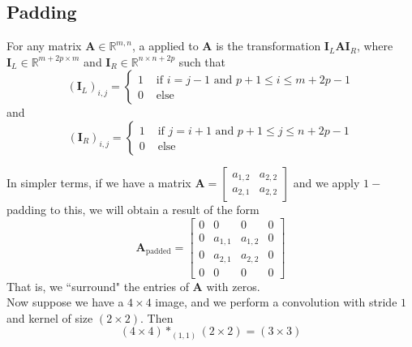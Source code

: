 \subsection{Padding}
\begin{definition}\label{def:Def11.1.1}
    For any matrix $\textbf{A} \in \mathbb{R}^{m,n}$, a  applied to $\textbf{A}$ is the transformation $\textbf{I}_L\textbf{A}\textbf{I}_R$, where $\textbf{I}_L \in \mathbb{R}^{m+2p\times m}$ and $\textbf{I}_R \in \mathbb{R}^{n \times n+2p}$ such that
    $$(\textbf{I}_L)_{i,j} = \begin{cases} 1 & \text{ if } i = j-1 \text{ and } p+1 \leq i \leq m + 2p - 1\\ 
    0 & \text{ else } \end{cases}$$
    and
    $$(\textbf{I}_R)_{i,j} = \begin{cases} 1 & \text{ if } j = i+1 \text{ and }  p+1\leq j \leq n+2p-1\\ 
    0 & \text{ else } \end{cases}$$
\end{definition}
In simpler terms, if we have a matrix $\textbf{A} = \begin{bmatrix} a_{1,2} & a_{2,2} \\ a_{2,1} & a_{2,2} \end{bmatrix}$ and we apply $1-$padding to this, we will obtain a result of the form
$$\textbf{A}_{\text{padded}} =
\begin{bmatrix}
0 & 0 & 0 & 0 \\
0 & a_{1,1} & a_{1,2} & 0 \\
0 & a_{2,1} & a_{2,2} & 0 \\
0 & 0 & 0 & 0
\end{bmatrix}
$$
That is, we ``surround" the entries of $\textbf{A}$ with zeros.\\

\noindent Now suppose we have a $4 \times 4$ image, and we perform a convolution with stride $1$ and kernel of size $(2 \times 2)$. Then
$$
(4 \times 4) \ast_{(1,1)} (2 \times 2) = (3 \times 3)
$$

